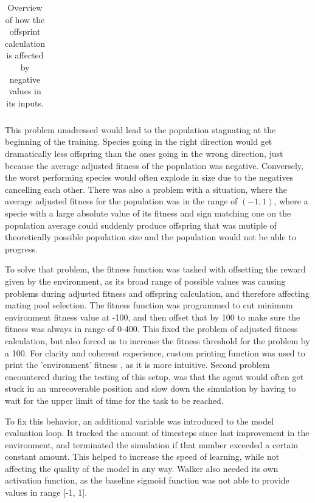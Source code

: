 \documentclass{article}
\begin{document}
\begin{itemize}
\begin{table}[H]
{\begin{tabular}{|l|l|l|l|l|}
    \end{tabular}%
    }
    \caption{Overview of how the offsprint calculation is affected by negative values in its inputs.}
    \end{table}
            This problem unadressed would lead to the population stagnating at the beginning of the training. Species going in the right direction would
            get dramatically less offspring than the ones going in the wrong direction, just because the average adjusted fitness of the population was negative.
            Conversely, the worst performing species would often explode in size due to the negatives cancelling each other.
            There was also a problem with a situation, where the average adjusted fitness for the population was in the range of $(-1,1)$, where a 
            specie with a large absolute value of its fitness and sign matching one on the population average could suddenly produce offspring
            that was mutiple of theoretically possible population size
            and the population would not be able to progress.   
            \par To solve that problem, the fitness function 
            was tasked with offsetting the reward given by the environment, as its broad range of possible values was causing
            problems during adjusted fitness and offspring calculation, and therefore affecting mating pool selection. The fitness function was 
            programmed to cut minimum environment fitness value at -100, and then offset that by 100 to make sure the fitness was always in range
            of 0-400. This fixed the problem of adjusted fitness calculation, but also forced us to increase the fitness threshold 
            for the problem by a 100. For clarity and coherent experience, custom printing function was used to print the 'environment' fitness
            , as it is more intuitive. 
            Second problem encountered during the testing of this setup, was that 
            the agent would often get stuck in an unrecoverable position and slow down the simulation by having to wait for the upper limit of time
            for the task to be reached.\par To fix this behavior, an additional variable was introduced to the model evaluation loop. It
            tracked the amount of timesteps since last improvement in the environment, and terminated the simulation if that number exceeded 
            a certain constant amount. This helped to increase the speed of learning, while not affecting the quality of the model in any way.
            Walker also needed its own activation function, as the baseline sigmoid function was not able to provide values in range [-1, 1].
            \end{itemize}
\end{document}
